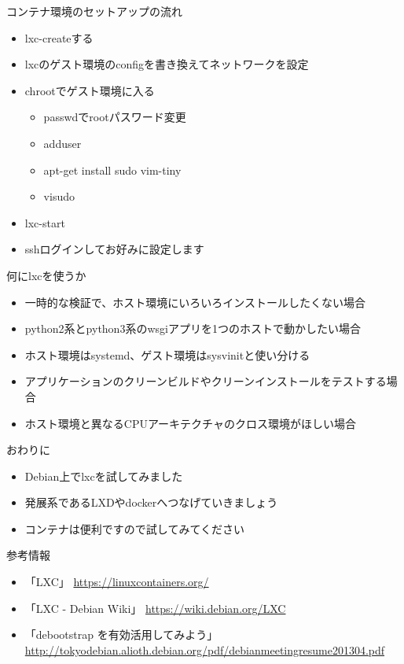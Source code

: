 
\begin{frame}[containsverbatim]{コンテナ環境のセットアップの流れ}
  \begin{itemize}
  \item lxc-createする
  \item lxcのゲスト環境のconfigを書き換えてネットワークを設定
  \item chrootでゲスト環境に入る
    \begin{itemize}
    \item passwdでrootパスワード変更
    \item adduser
    \item apt-get install sudo vim-tiny
    \item visudo
    \end{itemize}
  \item lxc-start
  \item sshログインしてお好みに設定します
  \end{itemize}
\end{frame}

\begin{frame}[containsverbatim]{何にlxcを使うか}
  \begin{itemize}
  \item 一時的な検証で、ホスト環境にいろいろインストールしたくない場合
  \item python2系とpython3系のwsgiアプリを1つのホストで動かしたい場合
  \item ホスト環境はsystemd、ゲスト環境はsysvinitと使い分ける
  \item アプリケーションのクリーンビルドやクリーンインストールをテストする場合
  \item ホスト環境と異なるCPUアーキテクチャのクロス環境がほしい場合
  \end{itemize}
\end{frame}


\begin{frame}[containsverbatim]{おわりに}
  \begin{itemize}
  \item Debian上でlxcを試してみました
  \item 発展系であるLXDやdockerへつなげていきましょう
  \item コンテナは便利ですので試してみてください
  \end{itemize}
\end{frame}


\begin{frame}{参考情報}
  \begin{itemize}
  \item 「LXC」 \url{https://linuxcontainers.org/}
  \item 「LXC - Debian Wiki」 \url{https://wiki.debian.org/LXC}
  \item 「debootstrap を有効活用してみよう」 \url{http://tokyodebian.alioth.debian.org/pdf/debianmeetingresume201304.pdf}
  \end{itemize}
\end{frame}




